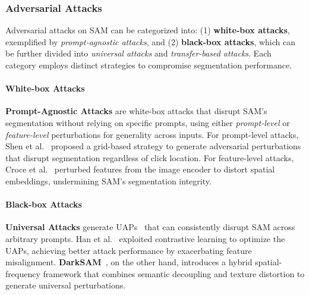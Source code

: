 \subsubsection{Adversarial Attacks}\label{sec:SAM-adv}

Adversarial attacks on SAM can be categorized into: (1) \textbf{white-box attacks}, exemplified by \emph{prompt-agnostic attacks}, and (2) \textbf{black-box attacks}, which can be further divided into \emph{universal attacks} and \emph{transfer-based attacks}. Each category employs distinct strategies to compromise segmentation performance.

\paragraph{White-box Attacks}
\textbf{Prompt-Agnostic Attacks} are white-box attacks that disrupt SAM's segmentation without relying on specific prompts, using either \emph{prompt-level} or \emph{feature-level} perturbations for generality across inputs.
For prompt-level attacks, Shen et al.~\cite{shen2024practical} proposed a grid-based strategy to generate adversarial perturbations that disrupt segmentation regardless of click location.
For feature-level attacks, Croce et al.~\cite{croce2024segment} perturbed features from the image encoder to distort spatial embeddings, undermining SAM’s segmentation integrity.

\paragraph{Black-box Attacks}

\textbf{Universal Attacks} generate UAPs~\cite{moosavi2017universal} that can consistently disrupt SAM across arbitrary prompts.  Han et al.~\cite{han2023segment} exploited contrastive learning to optimize the UAPs, achieving better attack performance by exacerbating feature misalignment.
\textbf{DarkSAM}~\cite{zhou2024darksam}, on the other hand, introduces a hybrid spatial-frequency framework that combines semantic decoupling and texture distortion to generate universal perturbations.  


